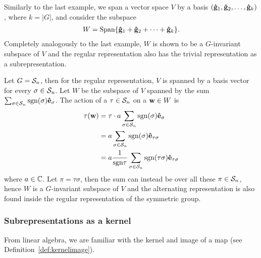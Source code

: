 \begin{example}\cite[Example 1.4.4.]{Sagan}
	Similarly to the last example, we span a vector space $V$ by a basis $(\mathbf{\hat{g}}_1, \mathbf{\hat{g}}_2, \dots, \mathbf{\hat{g}}_{k})$, where $k = |G|$, and consider the subspace 
	\begin{align*}
		W = \text{Span}\{ \mathbf{\hat{g}}_1 + \mathbf{\hat{g}}_2 + \dots + \mathbf{\hat{g}}_k \}. 
	\end{align*}
	Completely analogously to the last example, $W$ is shown to be a $G$-invariant subspace of $V$ and the regular representation also has the trivial representation as a subrepresentation.
\end{example}

\begin{example}\cite[Example 1.4.4.]{Sagan}
	Let $G = \mathcal{S}_n$, then for the regular representation, $V$ is spanned by a basis vector for every $\sigma \in \mathcal{S}_n$. Let $W$ be the subspace of $V$ spanned by the sum $\sum_{\sigma \in \mathcal{S}_n} \text{sgn}(\sigma) \mathbf{\hat{e}}_{\sigma}$. The action of a $\tau \in \mathcal{S}_n$ on a $\mathbf{w} \in W$ is
	\begin{align*}
		\tau (\mathbf{w}) &= \tau \cdot a\sum_{\sigma \in \mathcal{S}_n} \text{sgn}(\sigma) \mathbf{\hat{e}}_{\sigma} \\
		&= a \sum_{\sigma \in \mathcal{S}_n} \text{sgn}(\sigma) \mathbf{\hat{e}}_{\tau\sigma} \\
		&= a \frac{1}{\text{sgn}\tau} \sum_{\sigma \in \mathcal{S}_n} \text{sgn}(\tau\sigma) \mathbf{\hat{e}}_{\tau\sigma} \\
	\end{align*}
	where $a \in \mathbb{C}$. Let $\pi = \tau\sigma$, then the sum can instead be over all these $\pi \in \mathcal{S}_n$, hence $W$ is a $G$-invariant subspace of $V$ and the alternating representation is also found inside the regular representation of the symmetric group.
\end{example}

\subsubsection{Subrepresentations as a kernel}

From linear algebra, we are familiar with the kernel and image of a map (see Definition~\ref{def:kernelimage}).

